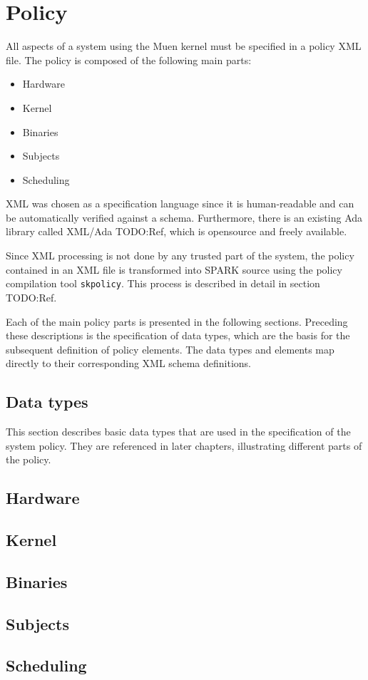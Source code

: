 \section{Policy}\label{sec:policy}
All aspects of a system using the Muen kernel must be specified in a policy XML
file. The policy is composed of the following main parts:

\begin{itemize}
	\item Hardware
	\item Kernel
	\item Binaries
	\item Subjects
	\item Scheduling
\end{itemize}

XML was chosen as a specification language since it is human-readable and can
be automatically verified against a schema. Furthermore, there is an existing
Ada library called XML/Ada TODO:Ref, which is opensource and freely available.

Since XML processing is not done by any trusted part of the system, the policy
contained in an XML file is transformed into SPARK source using the policy
compilation tool \texttt{skpolicy}. This process is described in detail in
section TODO:Ref.

Each of the main policy parts is presented in the following sections. Preceding
these descriptions is the specification of data types, which are the basis for
the subsequent definition of policy elements. The data types and elements map
directly to their corresponding XML schema definitions.

\subsection{Data types}
This section describes basic data types that are used in the specification of
the system policy. They are referenced in later chapters, illustrating different
parts of the policy.



\subsection{Hardware}
\label{subsec:hardware}


\subsection{Kernel}


\subsection{Binaries}


\subsection{Subjects}\label{subsec:subjects}


\subsection{Scheduling}

